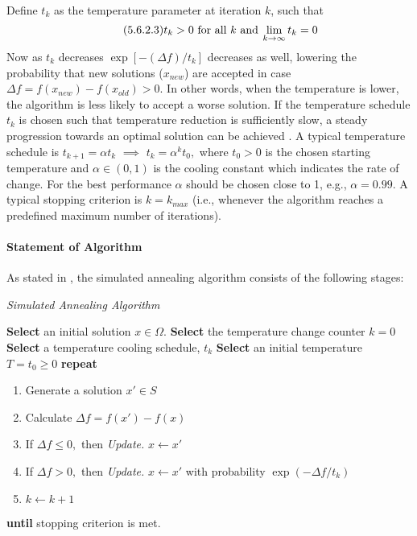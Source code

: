Define $t_{k}$ as the temperature parameter at iteration $k$, such that
\begin{equation}\tag{5.6.2.3}
t_k > 0 \hspace{0.33em}\text{for all}\hspace{0.33em} k \hspace{0.33em}\text{and}\hspace{0.23em}\lim_{k\rightarrow\infty}t_{k} = 0
\end{equation}
Now as $t_{k}$ decreases $\exp\left[-\left(\Delta f\right)/t_{k}\right]$ decreases as well, lowering the probability that new solutions ($x_{new}$) are accepted in case  $\Delta f = f(x_{new})-f(x_{old}) > 0.$ In other words, when the temperature is lower, the algorithm is less likely to accept a worse solution. If the temperature schedule $t_{k}$ is chosen such that temperature reduction is sufficiently slow, a steady progression towards an optimal solution can be achieved \cite[289]{Henderson2003}. A typical temperature schedule is $t_{k+1} = \alpha t_{k}$ $\implies$ $t_{k} = \alpha^{k} t_{0},$ where $t_{0} > 0$ is the chosen starting temperature and $\alpha \in (0, 1)$ is the cooling constant which indicates the rate of change. For the best performance $\alpha$ should be chosen close to 1, e.g., $\alpha=0.99.$ A typical stopping criterion is $k = k_{max}$ (i.e., whenever the algorithm reaches a predefined maximum number of iterations).
\paragraph{Statement of Algorithm}
As stated in \cite[290]{Henderson2003}, the simulated annealing algorithm consists of the following stages:
\begin{algorithm}
\caption{\textit{Simulated Annealing Algorithm}}\label{Pseudocode_SA}
\begin{algorithmic}
\State \textbf{Select} an initial solution $x \in \Omega$.
\State \textbf{Select} the temperature change counter $k=0$
\State \textbf{Select} a temperature cooling schedule, $t_{k}$ 
\State \textbf{Select} an initial temperature $T = t_{0} \geq 0$ 
\vspace{0.03cm}
\State \textbf{repeat}\\
\begin{enumerate}
    \item Generate a solution $x'\in S$ 
    \item Calculate $\Delta f = f(x')-f(x)$
    \item If $\Delta f \leq 0,$ then \textit{Update.} $x \leftarrow x'$
    \item If $\Delta f > 0,$ then \textit{Update.} $x \leftarrow x'$ with probability $\exp(-\Delta f / t_{k})$
    \item $k \leftarrow k + 1$
\end{enumerate}
\State \textbf{until} stopping criterion is met.
\end{algorithmic}
\end{algorithm}\\
\newpage
